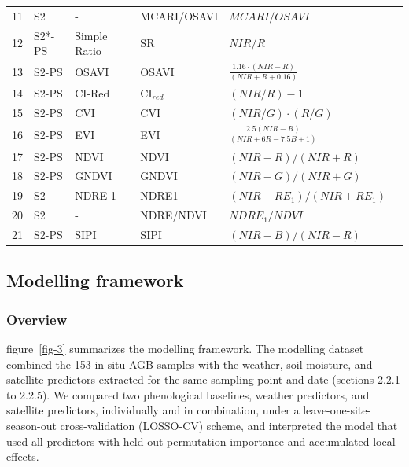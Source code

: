 \documentclass[
  british,
]{interact}
\begin{document}
\begin{table}[!htbp]
\begin{tabularx}{\textwidth}{@{} c l >{\raggedright\arraybackslash}p{1.6cm} l >{\raggedright\arraybackslash}X >{\raggedright\arraybackslash}p{2.3cm} @{}}
11 & S2 & - & MCARI/OSAVI & $MCARI/OSAVI$ & \citealt{Daughtry2000} \\
12 & S2*-PS & Simple Ratio & SR & $NIR/R$ & \citealt{Tucker1979} \\
13 & S2-PS & OSAVI & OSAVI & $\frac{1.16 \cdot (NIR - R)}{(NIR + R + 0.16)}$ & \citealt{Rondeaux1996} \\
14 & S2-PS & CI-Red & CI$_{red}$ & $(NIR/R) - 1$ & \citealt{Clevers2013} \\
15 & S2-PS & CVI & CVI & $(NIR/G) \cdot (R/G)$ & \citealt{Vincini2008} \\
16 & S2-PS & EVI & EVI & $\frac{2.5(NIR - R)}{(NIR + 6R - 7.5B + 1)}$ & \citealt{Huete2002} \\
17 & S2-PS & NDVI & NDVI & $(NIR - R)/(NIR + R)$ & \citealt{Rouse1974} \\
18 & S2-PS & GNDVI & GNDVI & $(NIR - G)/(NIR + G)$ & \citealt{Gitelson1996} \\
19 & S2 & NDRE 1 & NDRE1 & $(NIR - RE_1)/(NIR + RE_1)$ & \citealt{Magney2017} \\
20 & S2 & - & NDRE/NDVI & $NDRE_1/NDVI$ & \citealt{Raper2015} \\
21 & S2-PS & SIPI & SIPI & $(NIR - B)/(NIR - R)$ & \citealt{Penuelas1994} \\
\bottomrule
\end{tabularx}
\end{table}

\subsection{Modelling framework}\label{modelling-framework}

\subsubsection{Overview}\label{overview}

figure~\ref{fig-3} summarizes the modelling framework. The modelling
dataset combined the 153 in-situ AGB samples with the weather, soil
moisture, and satellite predictors extracted for the same sampling point
and date (sections 2.2.1 to 2.2.5). We compared two phenological
baselines, weather predictors, and satellite predictors, individually
and in combination, under a leave-one-site-season-out cross-validation
(LOSSO-CV) scheme, and interpreted the model that used all predictors
with held-out permutation importance and accumulated local effects.
\end{document}
